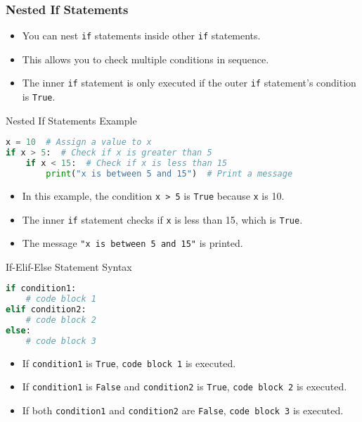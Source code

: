 \begin{frame}
    \frametitle{Nested If Statements}
    \begin{itemize}
        \item You can nest \texttt{if} statements inside other \texttt{if} statements.
        \item This allows you to check multiple conditions in sequence.
        \item The inner \texttt{if} statement is only executed if the outer \texttt{if} statement's condition is \texttt{True}.
    \end{itemize}
\end{frame}

\begin{frame}[fragile]{Nested If Statements Example}
    \begin{lstlisting}[style=colorful, language=Python]
x = 10  # Assign a value to x
if x > 5:  # Check if x is greater than 5
    if x < 15:  # Check if x is less than 15
        print("x is between 5 and 15")  # Print a message
    \end{lstlisting}
    \begin{itemize}
        \item In this example, the condition \texttt{x > 5} is \texttt{True} because \texttt{x} is 10.
        \item The inner \texttt{if} statement checks if \texttt{x} is less than 15, which is \texttt{True}.
        \item The message \texttt{"x is between 5 and 15"} is printed.
    \end{itemize}
\end{frame}

\begin{frame}[fragile]{If-Elif-Else Statement Syntax}
    \begin{lstlisting}[style=colorful, language=Python]
if condition1:
    # code block 1
elif condition2:
    # code block 2
else:
    # code block 3
    \end{lstlisting}
    \begin{itemize}
        \item If \texttt{condition1} is \texttt{True}, \texttt{code block 1} is executed.
        \item If \texttt{condition1} is \texttt{False} and \texttt{condition2} is \texttt{True}, \texttt{code block 2} is executed.
        \item If both \texttt{condition1} and \texttt{condition2} are \texttt{False}, \texttt{code block 3} is executed.
    \end{itemize}
\end{frame} 


